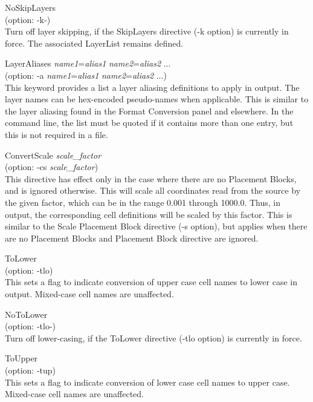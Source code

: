 \begin{description}
\item{\vt NoSkipLayers}\\
(option: {\vt -k-})\\
Turn off layer skipping, if the {\vt SkipLayers} directive ({\vt -k}
option) is currently in force.  The associated {\vt LayerList} remains
defined.

\item{\vt LayerAliases} {\it name1\/}={\it alias1}
  {\it name2\/}={\it alias2} ...\\
(option: {\vt -a} {\it name1\/}={\it alias1}
  {\it name2\/}={\it alias2} ...)\\
This keyword provides a list a layer aliasing definitions to apply in
output.  The layer names can be hex-encoded pseudo-names when
applicable.  This is similar to the layer aliasing found in the {\cb
Format Conversion} panel and elsewhere.  In the command line, the list
must be quoted if it contains more than one entry, but this is not
required in a file.

\item{\vt ConvertScale} {\it scale\_factor}\\
(option: {\vt -cs} {\it scale\_factor})\\
This directive has effect only in the case where there are no
Placement Blocks, and is ignored otherwise.  This will scale all
coordinates read from the source by the given factor, which can be in
the range 0.001 through 1000.0.  Thus, in output, the corresponding
cell definitions will be scaled by this factor.  This is similar to
the {\vt Scale} Placement Block directive ({\vt -s} option), but
applies when there are no Placement Blocks and Placement Block
directive are ignored.

\item{\vt ToLower}\\
(option: {\vt -tlo})\\
This sets a flag to indicate conversion of upper case cell names to
lower case in output.  Mixed-case cell names are unaffected.

\item{\vt NoToLower}\\
(option: {\vt -tlo-})\\
Turn off lower-casing, if the {\vt ToLower} directive ({\vt -tlo}
option) is currently in force.

\item{\vt ToUpper}\\
(option: {\vt -tup})\\
This sets a flag to indicate conversion of lower case cell names to
upper case.  Mixed-case cell names are unaffected.


\end{description}

